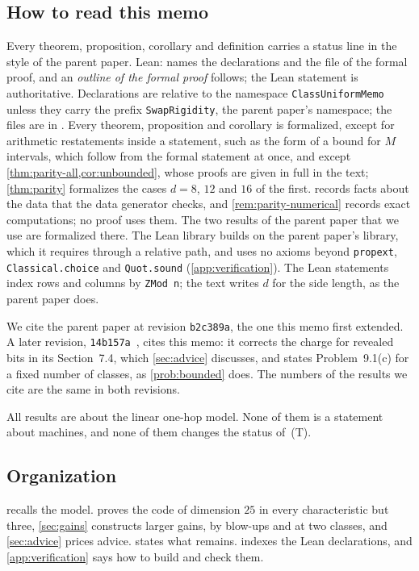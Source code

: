 \subsection{How to read this memo}

Every theorem, proposition, corollary and definition carries a status line in the style of the parent paper.
\textsf{Lean:} names the declarations and the file of the formal proof, and an \emph{outline of the formal proof}
follows; the Lean statement is authoritative. Declarations are relative to the namespace \texttt{ClassUniformMemo}
unless they carry the prefix \texttt{SwapRigidity}, the parent paper's namespace; the files are in
. Every theorem, proposition and corollary is formalized, except for arithmetic
restatements inside a statement, such as the form of a bound for $M$ intervals, which follow from the formal statement
at once, and except \cref{thm:parity-all,cor:unbounded}, whose proofs are given in full in the text;
\cref{thm:parity} formalizes the cases $d=8$, $12$ and $16$ of the first.  records facts about
the data that the data generator checks, and \cref{rem:parity-numerical} records exact computations; no proof uses
them.
The two results of the parent paper that we use are formalized there. The Lean library builds on the parent paper's
library, which it requires through a relative path, and uses no axioms beyond \texttt{propext},
\texttt{Classical.choice} and \texttt{Quot.sound} (\cref{app:verification}). The Lean statements index rows and
columns by \texttt{ZMod n}; the text writes $d$ for the side length, as the parent paper does.

We cite the parent paper at revision \texttt{b2c389a}, the one this memo first extended. A later revision,
\texttt{14b157a}~\cite{SeventeenthPaperRevised2026}, cites this memo: it corrects the charge for revealed bits in its
Section~7.4, which \cref{sec:advice} discusses, and states Problem~9.1(c) for a fixed number of classes, as
\cref{prob:bounded} does. The numbers of the results we cite are the same in both revisions.

All results are about the linear one-hop model. None of them is a statement about machines, and none of them changes
the status of~(T).

\subsection{Organization}

 recalls the model.  proves the code of dimension $25$ in every characteristic but
three, \cref{sec:gains} constructs larger gains, by blow-ups and at two classes, and \cref{sec:advice}
prices advice.  states what remains.  indexes the Lean declarations, and \cref{app:verification} says how to build and check
them.

